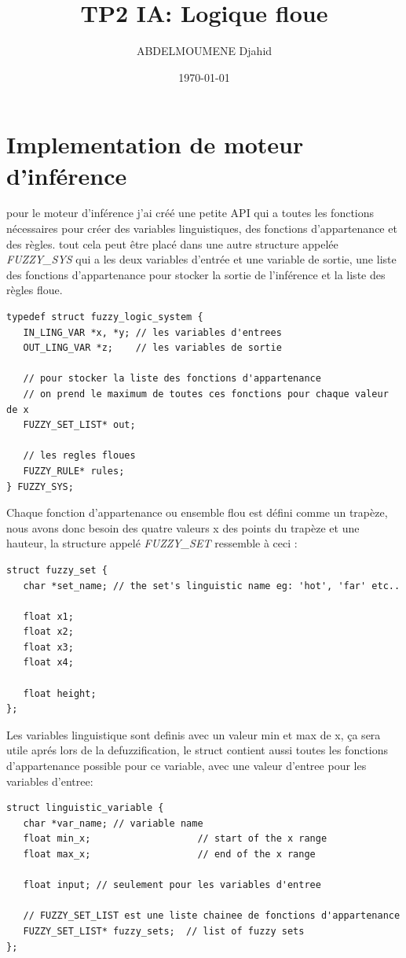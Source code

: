 \documentclass{article}
\title{TP2 IA: Logique floue}
\date{\today}
\author{ABDELMOUMENE Djahid}
\begin{document}
\maketitle

\section{Implementation de moteur d'inférence}

pour le moteur d'inférence j'ai créé une petite API qui a toutes les fonctions
nécessaires pour créer des variables linguistiques, des fonctions
d'appartenance et des règles. tout cela peut être placé dans une autre
structure appelée \textit{FUZZY\_SYS} qui a les deux variables d'entrée et une
variable de sortie, une liste des fonctions d'appartenance pour stocker la
sortie de l'inférence et la liste des règles floue.
\begin{lstlisting}
typedef struct fuzzy_logic_system {
   IN_LING_VAR *x, *y; // les variables d'entrees
   OUT_LING_VAR *z;    // les variables de sortie

   // pour stocker la liste des fonctions d'appartenance
   // on prend le maximum de toutes ces fonctions pour chaque valeur de x
   FUZZY_SET_LIST* out;

   // les regles floues
   FUZZY_RULE* rules;
} FUZZY_SYS;
\end{lstlisting}


Chaque fonction d'appartenance ou ensemble flou est défini comme un trapèze,
nous avons donc besoin des quatre valeurs x des points du trapèze et une
hauteur, la structure appelé \textit{FUZZY\_SET} ressemble à ceci :
\begin{lstlisting}
struct fuzzy_set {
   char *set_name; // the set's linguistic name eg: 'hot', 'far' etc..

   float x1;
   float x2;
   float x3;
   float x4;

   float height;
};
\end{lstlisting}

Les variables linguistique sont definis avec un valeur min et max de x, ça sera
utile aprés lors de la defuzzification, le struct contient aussi toutes les
fonctions d'appartenance possible pour ce variable, avec une valeur d'entree
pour les variables d'entree:

\begin{lstlisting}
struct linguistic_variable {
   char *var_name; // variable name
   float min_x;                   // start of the x range
   float max_x;                   // end of the x range

   float input; // seulement pour les variables d'entree

   // FUZZY_SET_LIST est une liste chainee de fonctions d'appartenance
   FUZZY_SET_LIST* fuzzy_sets;  // list of fuzzy sets
};
\end{lstlisting}
\end{document}
